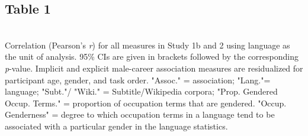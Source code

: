 \documentclass[9pt,twocolumn]{pnas-new}
\begin{document}
\subsection*{Table 1}~\\

Correlation (Pearson’s  \emph{r}) for all measures in Study 1b and 2 using language as the unit of analysis. 95\% CIs are given in brackets followed by the corresponding {\it p}-value. Implicit and explicit male-career association measures are residualized for participant age, gender, and task order. "Assoc." = association; "Lang."= language; "Subt."/ "Wiki." = Subtitle/Wikipedia corpora; "Prop. Gendered Occup. Terms." = proportion of occupation terms that are gendered. "Occup. Genderness" = degree to which occupation terms in a language tend to be associated with a particular gender in the language statistics.
\newpage


\newpage
\end{document}
